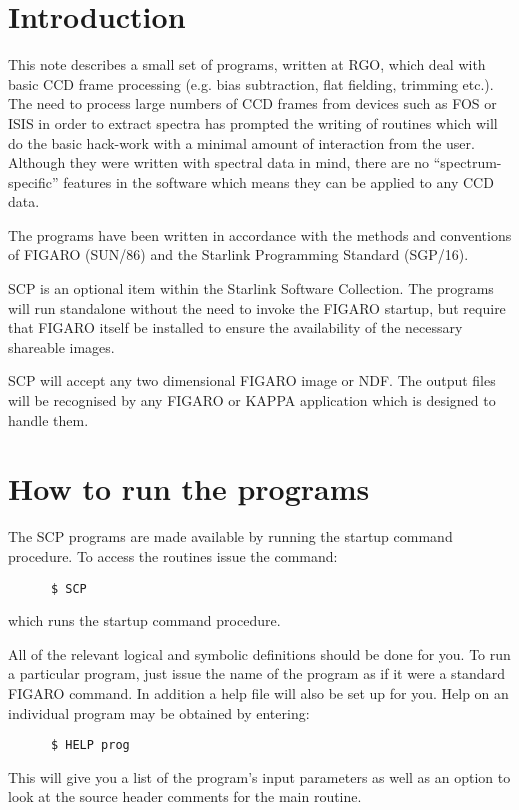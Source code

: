 \newpage
\section{Introduction}

This note describes a small set of programs, written at RGO, which deal with
basic CCD frame processing (e.g. bias subtraction, flat fielding, trimming
etc.).  The need to process large numbers of CCD frames from devices such as
FOS or ISIS in order to extract spectra has prompted the writing of routines
which will do the basic hack-work with a minimal amount of interaction from the
user. Although they were written with spectral data in mind, there are no
``spectrum-specific'' features in the software which means they can be applied
to any CCD data.

The programs have been written in accordance with the methods and
conventions of FIGARO (SUN/86) and the Starlink Programming Standard (SGP/16).

SCP is an optional item within the Starlink Software Collection. The programs
will run standalone without the need to invoke the FIGARO startup, but require
that FIGARO itself be installed to ensure the availability of the necessary
shareable images.

SCP will accept any two dimensional FIGARO image or NDF. The output files will
be recognised by any FIGARO or KAPPA application which is designed to handle
them.

\section{How to run the programs}

The SCP programs are made available by running the startup command procedure.
To access the routines issue the command:
\begin{verbatim}
      $ SCP
\end{verbatim}
which runs the startup command procedure.

All of the relevant logical and symbolic definitions should be done for
you. To run a particular program, just issue the name of the program as if
it were a standard FIGARO command. In addition a help file will also be
set up for you. Help on an individual program may be obtained by entering:
\begin{verbatim}
      $ HELP prog
\end{verbatim}
This will give you a list of the program's input parameters as well as an
option to look at the source header comments for the main routine.

